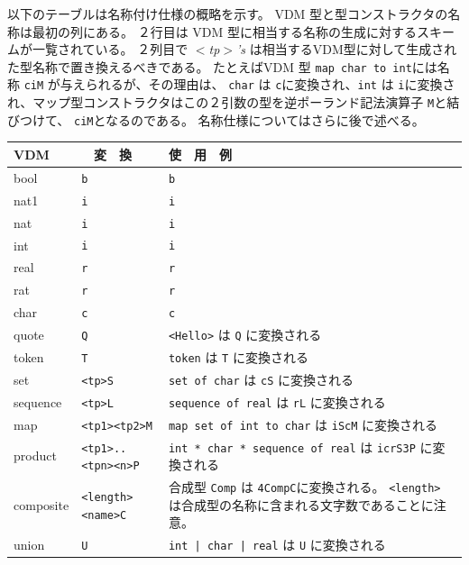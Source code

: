\documentclass[\pformat,12pt]{jarticle}
\begin{document}
以下のテーブルは名称付け仕様の概略を示す。
VDM 型と型コンストラクタの名称は最初の列にある。
２行目は VDM 型に相当する名称の生成に対するスキームが一覧されている。
２列目で {\em $<$tp$>$'s} は相当するVDM型に対して生成された型名称で置き換えるべきである。
たとえばVDM 型 \verb+map char to int+には名称 \verb+ciM+ が与えられるが、その理由は、 \verb+char+ は \verb+c+に変換され、\verb+int+ は \verb+i+に変換され、マップ型コンストラクタはこの２引数の型を逆ポーランド記法演算子 \verb+M+と結びつけて、 \verb+ciM+となるのである。 
名称仕様についてはさらに後で述べる。

\begin{longtable}{|l|l|p{7cm}|} \hline
  VDM            & 　変　換   & 使　用　例 \\ \hline \hline
\endhead
\hline
\endfoot
\hline
  bool           & \verb+b+      & \verb+b+ \\ \hline
  nat1           & \verb+i+      & \verb+i+ \\ 
  nat            & \verb+i+      & \verb+i+ \\ 
  int            & \verb+i+      & \verb+i+ \\ \hline
  real           & \verb+r+      & \verb+r+ \\ 
  rat            & \verb+r+      & \verb+r+ \\ \hline
  char           & \verb+c+      & \verb+c+ \\ \hline
  quote          & \verb+Q+      & \verb+<Hello>+ は \verb+Q+ に変換される \\ \hline
  token          & \verb+T+      & \verb+token+ は \verb+T+ に変換される \\ \hline
  set            & \verb+<tp>S+  & \verb+set of char+ は \verb+cS+ に変換される \\ \hline
  sequence       & \verb+<tp>L+  & \verb+sequence of real+ は \verb+rL+ に変換される \\ \hline
  map            & \verb+<tp1><tp2>M+ & \verb+map set of int to char+ は \verb+iScM+ に変換される　\\ \hline
  product        & \verb+<tp1>..<tpn><n>P+ & \verb+int * char * sequence of real+ は \verb+icrS3P+ に変換される　\\ \hline
  composite      & \verb+<length><name>C+ & 合成型 \verb+Comp+ は \verb+4CompC+に変換される。
 \verb+<length>+ は合成型の名称に含まれる文字数であることに注意。 \\ \hline 
  union          & \verb+U+ & \verb+int | char | real+ は \verb+U+ に変換される　\\ \hline

\end{longtable}
\end{document}
